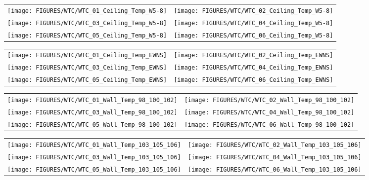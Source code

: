 \begin{figure}[p]
\begin{tabular*}{\textwidth}{l@{\extracolsep{\fill}}r}
\texttt{[image: FIGURES/WTC/WTC\_01\_Ceiling\_Temp\_W5-8]} &
\texttt{[image: FIGURES/WTC/WTC\_02\_Ceiling\_Temp\_W5-8]} \\
\texttt{[image: FIGURES/WTC/WTC\_03\_Ceiling\_Temp\_W5-8]} &
\texttt{[image: FIGURES/WTC/WTC\_04\_Ceiling\_Temp\_W5-8]} \\
\texttt{[image: FIGURES/WTC/WTC\_05\_Ceiling\_Temp\_W5-8]} &
\texttt{[image: FIGURES/WTC/WTC\_06\_Ceiling\_Temp\_W5-8]}
\end{tabular*}
\label{NIST_WTC_Ceiling_W5-8}
\end{figure}

\begin{figure}[p]
\begin{tabular*}{\textwidth}{l@{\extracolsep{\fill}}r}
\texttt{[image: FIGURES/WTC/WTC\_01\_Ceiling\_Temp\_EWNS]} &
\texttt{[image: FIGURES/WTC/WTC\_02\_Ceiling\_Temp\_EWNS]} \\
\texttt{[image: FIGURES/WTC/WTC\_03\_Ceiling\_Temp\_EWNS]} &
\texttt{[image: FIGURES/WTC/WTC\_04\_Ceiling\_Temp\_EWNS]} \\
\texttt{[image: FIGURES/WTC/WTC\_05\_Ceiling\_Temp\_EWNS]} &
\texttt{[image: FIGURES/WTC/WTC\_06\_Ceiling\_Temp\_EWNS]}
\end{tabular*}
\label{NIST_WTC_Ceiling_EWNS}
\end{figure}

\begin{figure}[p]
\begin{tabular*}{\textwidth}{l@{\extracolsep{\fill}}r}
\texttt{[image: FIGURES/WTC/WTC\_01\_Wall\_Temp\_98\_100\_102]} &
\texttt{[image: FIGURES/WTC/WTC\_02\_Wall\_Temp\_98\_100\_102]} \\
\texttt{[image: FIGURES/WTC/WTC\_03\_Wall\_Temp\_98\_100\_102]} &
\texttt{[image: FIGURES/WTC/WTC\_04\_Wall\_Temp\_98\_100\_102]} \\
\texttt{[image: FIGURES/WTC/WTC\_05\_Wall\_Temp\_98\_100\_102]} &
\texttt{[image: FIGURES/WTC/WTC\_06\_Wall\_Temp\_98\_100\_102]}
\end{tabular*}
\label{NIST_WTC_Wall_98_100_102}
\end{figure}

\begin{figure}[p]
\begin{tabular*}{\textwidth}{l@{\extracolsep{\fill}}r}
\texttt{[image: FIGURES/WTC/WTC\_01\_Wall\_Temp\_103\_105\_106]} &
\texttt{[image: FIGURES/WTC/WTC\_02\_Wall\_Temp\_103\_105\_106]} \\
\texttt{[image: FIGURES/WTC/WTC\_03\_Wall\_Temp\_103\_105\_106]} &
\texttt{[image: FIGURES/WTC/WTC\_04\_Wall\_Temp\_103\_105\_106]} \\
\texttt{[image: FIGURES/WTC/WTC\_05\_Wall\_Temp\_103\_105\_106]} &
\texttt{[image: FIGURES/WTC/WTC\_06\_Wall\_Temp\_103\_105\_106]}
\end{tabular*}
\label{NIST_WTC_Wall_103_105_106}
\end{figure}

